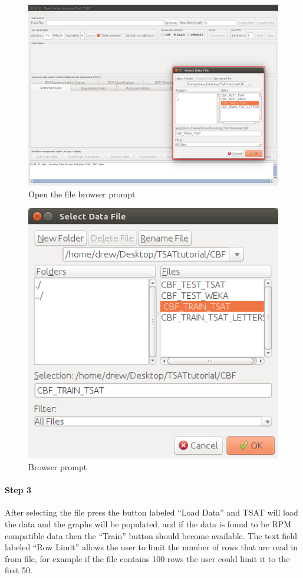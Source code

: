 \documentclass[letterpaper, 12pt]{article}
\begin{document}
\begin{figure}[H]
	\includegraphics[width=\textwidth]{TSAT-training-step-2}
	\caption{Open the file browser prompt}
	\label{fig:TSAT-training-step-2}
\end{figure}
\begin{figure}[H]
	\center
	\includegraphics[width=.4\textwidth]{TSAT-training-step-3}
	\caption{Browser prompt}
	\label{fig:TSAT-training-step-3}
\end{figure}

\newpage
\paragraph{Step 3}
After selecting the file press the button labeled ``Load Data'' and  TSAT will load the data and the graphs will be populated, and if the data is found to be RPM compatible data then the ``Train'' button should become available. The text field labeled ``Row Limit'' allows the user to limit the number of rows that are read in from file, for example if the file contains 100 rows the user could limit it to the first 50. 
\end{document}
